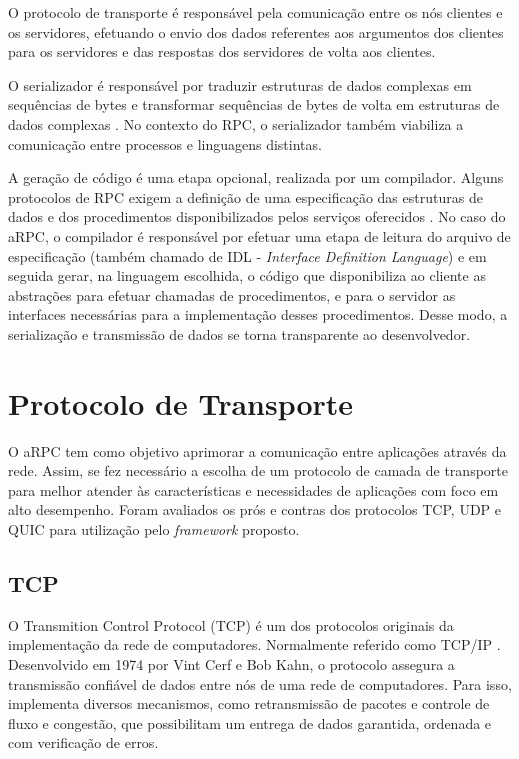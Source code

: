 O protocolo de transporte é responsável pela comunicação entre os nós clientes e os servidores, efetuando o envio dos dados referentes aos argumentos dos clientes para os servidores e das respostas dos servidores de volta aos clientes.

O serializador é responsável por traduzir estruturas de dados complexas em sequências de bytes e transformar sequências de bytes de volta em estruturas de dados complexas \cite{newmarch_data_2017}. No contexto do RPC, o serializador também viabiliza a comunicação entre processos e linguagens distintas.

A geração de código é uma etapa opcional, realizada por um compilador. Alguns protocolos de RPC exigem a definição de uma especificação das estruturas de dados e dos procedimentos disponibilizados pelos serviços oferecidos \cite{ford_using_1995}. No caso do aRPC, o compilador é responsável por efetuar uma etapa de leitura do arquivo de especificação (também chamado de IDL - \textit{Interface Definition Language}) e em seguida gerar, na linguagem escolhida, o código que disponibiliza ao cliente as abstrações para efetuar chamadas de procedimentos, e para o servidor as interfaces necessárias para a implementação desses procedimentos. Desse modo, a serialização e transmissão de dados se torna transparente ao desenvolvedor.

\section{Protocolo de Transporte}

O aRPC tem como objetivo aprimorar a comunicação entre aplicações através da rede. Assim, se fez necessário a escolha de um protocolo de camada de transporte para melhor atender às características e necessidades de aplicações com foco em alto desempenho. Foram avaliados os prós e contras dos protocolos TCP, UDP e QUIC para utilização pelo \textit{framework} proposto.


\subsection{TCP}

O Transmition Control Protocol (TCP) é um dos protocolos originais da implementação da rede de computadores. Normalmente referido como TCP/IP \cite{cerf_protocol_1974}.
Desenvolvido em 1974 por Vint Cerf e Bob Kahn, o protocolo assegura a transmissão confiável de dados entre nós de uma rede de computadores. Para isso, implementa diversos mecanismos, como retransmissão de pacotes e controle de fluxo e congestão, que possibilitam um entrega de dados garantida, ordenada e com verificação de erros.

